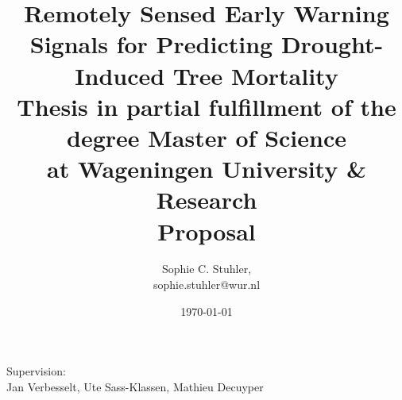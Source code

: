 \documentclass[a4paper]{article}
\title{Remotely Sensed Early Warning Signals for Predicting Drought-Induced Tree Mortality\\
\bigskip
\large{Thesis in partial fulfillment of the degree Master of Science\\
at Wageningen University \& Research}\\
\smallskip
\large{Proposal}}
\date{\today}
\author{Sophie C. Stuhler,\\sophie.stuhler@wur.nl}
\begin{document}
\begin{titlepage} %
	\clearpage
	\vspace{7cm}
	\maketitle %
	\vspace{5mm}
	\begin{center}
	\end{center}
	\vspace{5mm}
	\thispagestyle{empty}
\begin{center}
	
	\bigskip
	\large{
	Supervision:\\
	Jan Verbesselt, Ute Sass-Klassen, Mathieu Decuyper
	}
\end{center}

\end{titlepage}

\newpage %
\tableofcontents


\newpage %

	

\newpage


\newpage


\newpage


\newpage


\newpage


\newpage

	
\newpage %
\clearpage
{}\label{glossary}
\printglossaries
\newpage %


	
\end{document}
